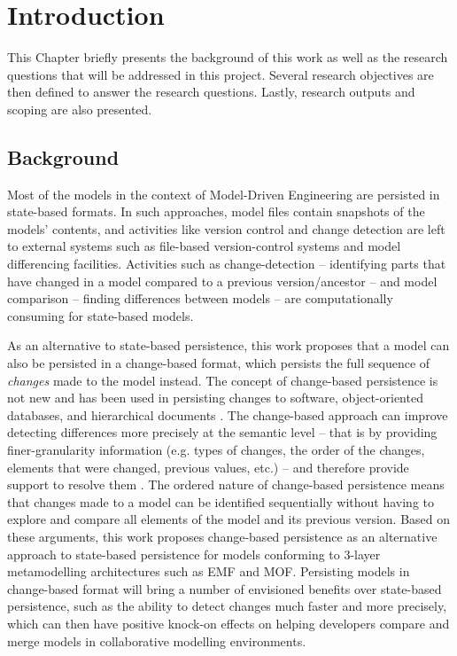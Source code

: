 \documentclass[12pt, a4paper]{report} \usepackage[titletoc]{appendix}
\begin{document}
\tableofcontents
{}

\listoffigures
\newpage
 
\listoftables
\newpage

\lstlistoflistings
\newpage

\chapter{Introduction}
\label{ch:introduction}
This Chapter briefly presents the background of this work as well as the research questions that will be addressed in this project. Several research objectives are then defined to answer the research questions. Lastly, research outputs and scoping are also presented. 

\section{Background}
\label{sec:background}
Most of the models in the context of Model-Driven Engineering are persisted in state-based formats. In such approaches, model files contain snapshots of the models' contents, and activities like version control and change detection are left to external systems such as file-based version-control systems and model differencing facilities. Activities such as change-detection -- identifying parts that have changed in a model compared to a previous version/ancestor -- and model comparison -- finding differences between models -- are computationally consuming for state-based models.

As an alternative to state-based persistence, this work proposes that a model can also be persisted in a change-based format, which persists the full sequence of \emph{changes} made to the model instead. The concept of change-based persistence is not new and has been used in persisting changes to software, object-oriented databases, and hierarchical documents \cite{DBLP:journals/entcs/RobbesL07,DBLP:conf/sde/LippeO92,DBLP:conf/caise/IgnatN05}. The change-based approach can improve detecting differences more precisely at the semantic level -- that is by providing finer-granularity information (e.g. types of changes, the order of the changes, elements that were changed, previous values, etc.) -- and therefore provide support to resolve them \cite{mens2002state}. The ordered nature of change-based persistence means that changes made to a model can be identified sequentially without having to explore and compare all elements of the model and its previous version. Based on these arguments, this work proposes change-based persistence as an alternative approach to state-based persistence for models conforming to 3-layer metamodelling architectures such as EMF and MOF. Persisting models in change-based format will bring a number of envisioned benefits over state-based persistence, such as the ability to detect changes much faster and more precisely, which can then have positive knock-on effects on helping developers compare and merge models in collaborative modelling environments. 
\end{document}
